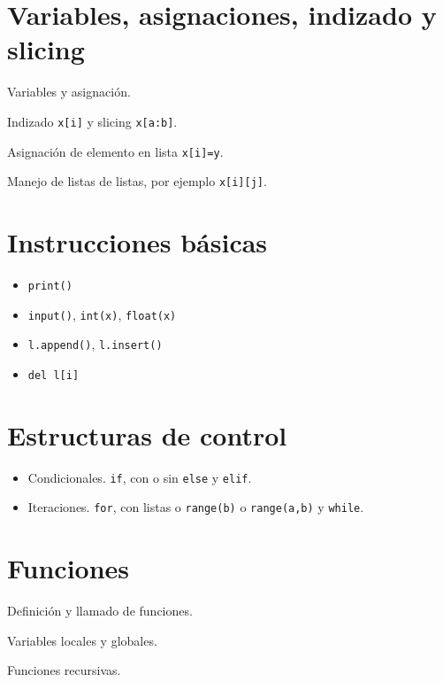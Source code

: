 \documentclass[a4paper, 12pt]{article}
\theoremstyle{definition}
\begin{document}
\section{Variables, asignaciones, indizado y slicing}
Variables y asignación.

Indizado {\tt x[i]} y slicing {\tt x[a:b]}. 

Asignación de elemento en lista {\tt x[i]=y}.

Manejo de listas de listas, por ejemplo {\tt x[i][j]}.

\section{Instrucciones básicas}

\begin{itemize}
	\item {\tt print()}
	\item {\tt input()}, {\tt int(x)}, {\tt float(x)}
	\item {\tt l.append()}, {\tt l.insert()}
	\item {\tt del l[i]}
	
\end{itemize}

\section{Estructuras de control}
\begin{itemize}
	\item Condicionales. {\tt if}, con o sin {\tt else} y {\tt elif}.
	\item Iteraciones. {\tt for}, con listas o {\tt range(b)} o {\tt range(a,b)} y {\tt while}.
\end{itemize}

\section{Funciones}

Definición y llamado de funciones.

Variables locales y globales.

Funciones recursivas.
\end{document}
